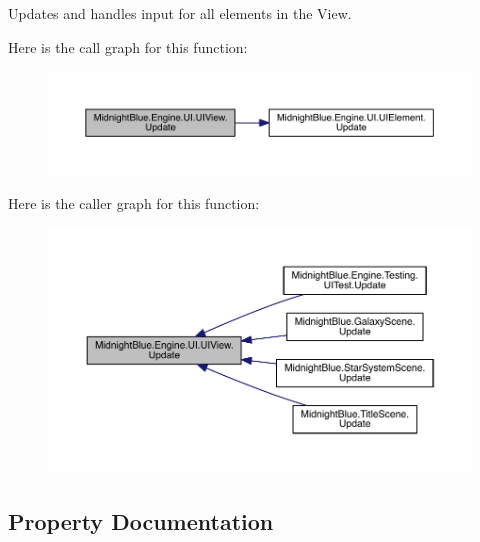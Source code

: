 Updates and handles input for all elements in the View. 

Here is the call graph for this function\+:
\nopagebreak
\begin{figure}[H]
\begin{center}
\leavevmode
\includegraphics[width=350pt]{class_midnight_blue_1_1_engine_1_1_u_i_1_1_u_i_view_aba1d6f02ef75ed1a595f448acef47915_cgraph}
\end{center}
\end{figure}
Here is the caller graph for this function\+:
\nopagebreak
\begin{figure}[H]
\begin{center}
\leavevmode
\includegraphics[width=350pt]{class_midnight_blue_1_1_engine_1_1_u_i_1_1_u_i_view_aba1d6f02ef75ed1a595f448acef47915_icgraph}
\end{center}
\end{figure}


\subsection{Property Documentation}
\hypertarget{class_midnight_blue_1_1_engine_1_1_u_i_1_1_u_i_view_ab4edda3ba89c275a7ba619eba97fc244}{}\label{class_midnight_blue_1_1_engine_1_1_u_i_1_1_u_i_view_ab4edda3ba89c275a7ba619eba97fc244} 
